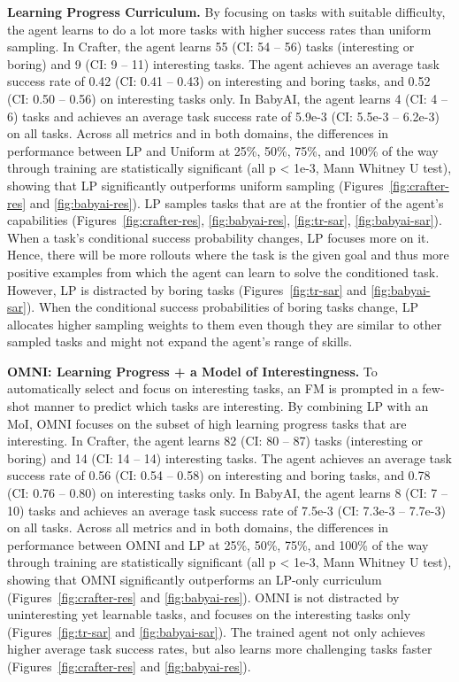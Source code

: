 \documentclass{article} %
\begin{document}
\textbf{Learning Progress Curriculum.} By focusing on tasks with suitable difficulty, the agent learns to do a lot more tasks with higher success rates than uniform sampling. In Crafter, the agent learns 55 (CI: 54 -- 56) tasks (interesting or boring) and 9 (CI: 9 -- 11) interesting tasks. The agent achieves an average task success rate of 0.42 (CI: 0.41 -- 0.43) on interesting and boring tasks, and 0.52 (CI: 0.50 -- 0.56) on interesting tasks only. In BabyAI, the agent learns 4 (CI: 4 -- 6) tasks and achieves an average task success rate of 5.9e-3 (CI: 5.5e-3 -- 6.2e-3) on all tasks. Across all metrics and in both domains, the differences in performance between LP and Uniform at 25\%, 50\%, 75\%, and 100\% of the way through training are statistically significant (all p < 1e-3, Mann Whitney U test), showing that LP significantly outperforms uniform sampling (Figures~\ref{fig:crafter-res} and \ref{fig:babyai-res}). LP samples tasks that are at the frontier of the agent's capabilities (Figures~\ref{fig:crafter-res}, \ref{fig:babyai-res}, \ref{fig:tr-sar}, \ref{fig:babyai-sar}). When a task's conditional success probability changes, LP focuses more on it. Hence, there will be more rollouts where the task is the given goal and thus more positive examples from which the agent can learn to solve the conditioned task. However, LP is distracted by boring tasks (Figures~\ref{fig:tr-sar} and \ref{fig:babyai-sar}). When the conditional success probabilities of boring tasks change, LP allocates higher sampling weights to them even though they are similar to other sampled tasks and might not expand the agent's range of skills.

\textbf{OMNI: Learning Progress + a Model of Interestingness.} 
To automatically select and focus on interesting tasks, an FM is prompted in a few-shot manner to predict which tasks are interesting. By combining LP with an MoI, OMNI focuses on the subset of high learning progress tasks that are interesting. In Crafter, the agent learns 82 (CI: 80 -- 87) tasks (interesting or boring) and 14 (CI: 14 -- 14) interesting tasks. The agent achieves an average task success rate of 0.56 (CI: 0.54 -- 0.58) on interesting and boring tasks, and 0.78 (CI: 0.76 -- 0.80) on interesting tasks only. In BabyAI, the agent learns 8 (CI: 7 -- 10) tasks and achieves an average task success rate of 7.5e-3 (CI: 7.3e-3 -- 7.7e-3) on all tasks. Across all metrics and in both domains, the differences in performance between OMNI and LP at 25\%, 50\%, 75\%, and 100\% of the way through training are statistically significant (all p < 1e-3, Mann Whitney U test), showing that OMNI significantly outperforms an LP-only curriculum (Figures~\ref{fig:crafter-res} and \ref{fig:babyai-res}). OMNI is not distracted by uninteresting yet learnable tasks, and focuses on the interesting tasks only (Figures~\ref{fig:tr-sar} and \ref{fig:babyai-sar}). The trained agent not only achieves higher average task success rates, but also learns more challenging tasks faster (Figures~\ref{fig:crafter-res} and \ref{fig:babyai-res}).
\end{document}
